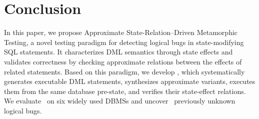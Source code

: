 \vspace{-2mm}
\section{Conclusion}
In this paper, we propose Approximate State-Relation--Driven Metamorphic Testing, a novel testing paradigm for detecting logical bugs in state-modifying SQL statements. 
It characterizes DML semantics through state effects and validates correctness by checking approximate relations between the effects of related statements. 
Based on this paradigm, we develop \toolname, which systematically generates executable DML statements, synthesizes approximate variants, executes them from the same database pre-state, and verifies their state-effect relations. 
We evaluate \toolname\ on six widely used DBMSs and uncover \logical\ previously unknown logical bugs. 